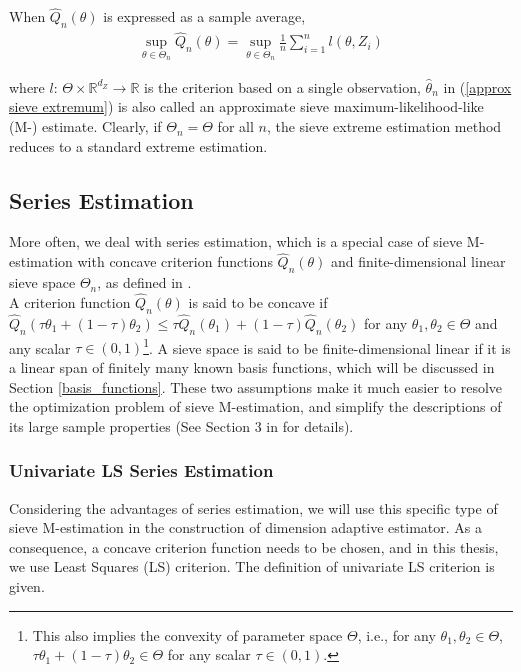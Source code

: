 \documentclass[12pt, a4paper]{article}
\theoremstyle{MAstyle} \newtheorem{assumption}{Assumption}[section]
\theoremstyle{MAstyle} \newtheorem{definition}{Definition}[section]
\theoremstyle{MAstyle} \newtheorem{theorem}{Theorem}[section]
\theoremstyle{MAstyle} \newtheorem{corollary}{Corollary}[section]
\begin{document}
            When $\widehat{Q}_n(\theta)$ is expressed as a sample average,
            \begin{align}\label{sieve_M-estimation}
                \sup_{\theta \in \mathit{\Theta_n}} \widehat{Q}_n(\theta)=\sup_{\theta \in \mathit{\Theta_n}} \frac{1}{n} \sum_{i=1}^n l(\theta,Z_i)
            \end{align}

            where $l$: $\mathit{\Theta} \times \mathbb{R}^{d_Z} \rightarrow \mathbb{R}$ is the criterion based on a single observation, $\hat{\theta}_n$ in (\ref{approx sieve extremum}) is also called an approximate sieve maximum-likelihood-like (M-) estimate. Clearly, if $\mathit{\Theta_n}=\mathit{\Theta}$ for all $n$, the sieve extreme estimation method reduces to a standard extreme estimation. 

        \subsection{Series Estimation}\label{series_estimation}
            More often, we deal with series estimation, which is a special case of sieve M-estimation with concave criterion functions $\widehat{Q}_n(\theta)$ and finite-dimensional linear sieve space $\mathit{\Theta_n}$, as defined in \cite{Chen_2007}.\\
            
            A criterion function $\widehat{Q}_n(\theta)$ is said to be concave if $\widehat{Q}_n(\tau\theta_1+(1-\tau)\theta_2) \le \tau\widehat{Q}_n(\theta_1)+(1-\tau)\widehat{Q}_n(\theta_2)$ for any $\theta_1, \theta_2 \in \mathit{\Theta}$ and any scalar $\tau \in (0,1)$\footnote{This also implies the convexity of parameter space $\mathit{\Theta}$, i.e., for any $\theta_1, \theta_2 \in \mathit{\Theta}$, $\tau\theta_1+(1-\tau)\theta_2 \in \mathit{\Theta}$ for any scalar $\tau \in (0,1)$.}. A sieve space is said to be finite-dimensional linear if it is a linear span of finitely many known basis functions, which will be discussed in Section \ref{basis_functions}. These two assumptions make it much easier to resolve the optimization problem of sieve M-estimation, and simplify the descriptions of its large sample properties (See Section 3 in \cite{Chen_2007} for details).

            \subsubsection{Univariate LS Series Estimation}
            Considering the advantages of series estimation, we will use this specific type of sieve M-estimation in the construction of dimension adaptive estimator. As a consequence, a concave criterion function needs to be chosen, and in this thesis, we use Least Squares (LS) criterion. The definition of univariate LS criterion is given.
\end{document}
